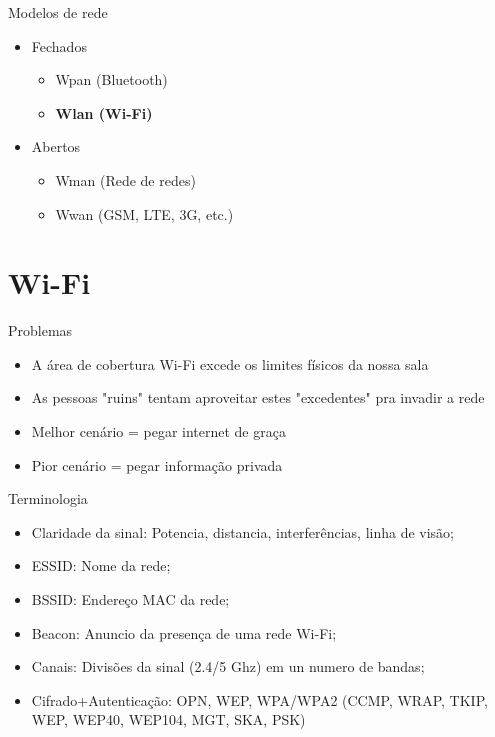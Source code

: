 \documentclass[xcolor=x11names,compress]{beamer}
\renewcommand{\(}{\begin{columns}}
\renewcommand{\)}{\end{columns}}
\newcommand{\<}[1]{\begin{column}{#1}}
\renewcommand{\>}{\end{column}}
\begin{document}
\begin{frame}{Modelos de rede}
\begin{itemize}
\item Fechados
\begin{itemize}
\item Wpan (Bluetooth)
\item \textbf{Wlan (Wi-Fi)}
\end{itemize}
\item Abertos
\begin{itemize}
\item Wman (Rede de redes)
\item Wwan (GSM, LTE, 3G, etc.)
\end{itemize}
\end{itemize}
\end{frame}

\section[Wi-Fi]{Wi-Fi}
\begin{frame}{Problemas}
\pause
\begin{itemize}[<+->]
\item A área de cobertura Wi-Fi excede os limites físicos da nossa sala
\item As pessoas "ruins" tentam aproveitar estes "excedentes" pra invadir a rede
\item Melhor cenário = pegar internet de graça
\item Pior cenário = pegar informação privada
\end{itemize}
\end{frame}

\begin{frame}{Terminologia}
\begin{itemize}
\item {Claridade da sinal:} Potencia, distancia, interferências, linha de visão;
\item {ESSID:} Nome da rede;
\item {BSSID:} Endereço MAC da rede;
\item {Beacon:} Anuncio da presença de uma rede Wi-Fi;
\item {Canais:} Divisões da sinal (2.4/5 Ghz) em un numero de bandas;

\item {Cifrado+Autenticação:} OPN, WEP, WPA/WPA2 (CCMP, WRAP, TKIP, WEP, WEP40, WEP104, MGT, SKA, PSK) 
\end{itemize}
\end{frame}
\end{document}
